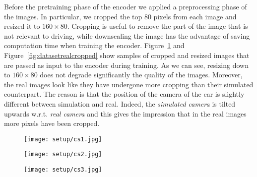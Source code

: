 
Before the pretraining phase of the encoder we applied a preprocessing phase of the images. In particular, we cropped the top 80 pixels from each image and resized it to $160 \times 80$. Cropping is useful to remove the part of the image that is not relevant to driving, while downscaling the image has the advantage of saving computation time when training the encoder. Figure~\ref{fig:datasetsimcropped} and Figure~\ref{fig:datasetrealcropped} show samples of cropped and resized images that are passed as input to the encoder during training. As we can see, resizing down to $160 \times 80$ does not degrade significantly the quality of the images. Moreover, the real images look like they have undergone more cropping than their simulated counterpart. The reason is that the position of the camera of the car is slightly different between simulation and real. Indeed, the \textit{simulated camera} is tilted upwards w.r.t. \textit{real camera} and this gives the impression that in the real images more pixels have been cropped.


\begin{figure}[h]
	\begin{minipage}{.33\textwidth}
		\centering
		\texttt{[image: setup/cs1.jpg]}
	\end{minipage}%
	\begin{minipage}{.33\textwidth}
		\centering
		\texttt{[image: setup/cs2.jpg]}
	\end{minipage}%
	\begin{minipage}{.33\textwidth}
		\centering
		\texttt{[image: setup/cs3.jpg]}
	\end{minipage}
	\label{fig:datasetsimcropped}
\end{figure}

